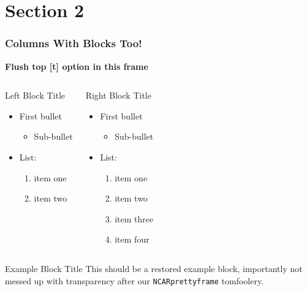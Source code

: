 \documentclass[aspectratio=1610]{beamer}
\begin{document}
\section{Section 2}
\begin{frame}[t]
  \frametitle{Columns With Blocks Too!}

  \textbf{Flush top [t] option in this frame}

  \begin{columns}[t]
    \begin{block}{Left Block Title}
    \begin{itemize}
    \item First bullet
      \begin{itemize}
      \item Sub-bullet
      \end{itemize}
    \item List:
      \begin{enumerate}
      \item item one
      \item item two
      \end{enumerate}
    \end{itemize}
    \end{block}
    \begin{block}{Right Block Title}
    \begin{itemize}
    \item First bullet
      \begin{itemize}
      \item Sub-bullet
      \end{itemize}
    \item List:
      \begin{enumerate}
      \item item one
      \item item two
      \item item three
      \item item four
      \end{enumerate}
    \end{itemize}
    \end{block}
  \end{columns}

  \begin{exampleblock}{Example Block Title}
    This should be a restored example block, importantly not messed up with transparency after our \texttt{NCARprettyframe} tomfoolery.
  \end{exampleblock}
\end{frame}
\end{document}
